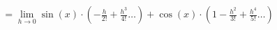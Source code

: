 \documentclass[preview]{standalone}
\begin{document}
\begin{align*}
= \lim_{h \to 0} \sin(x) \cdot \left(-\frac{h}{2!} + \frac{h^3}{4!} \dots \right) + \cos(x) \cdot \left(1 - \frac{h^2}{3!} + \frac{h^4}{5!} \dots \right)
\end{align*}
\end{document}

